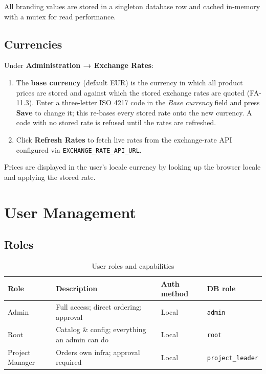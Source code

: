\documentclass[12pt,a4paper,twoside]{report}
\newcommand{\code}[1]{\texttt{#1}}
\begin{document}
All branding values are stored in a singleton database row and cached
in-memory with a mutex for read performance.

\section{Currencies}
\label{sec:currencies}

Under \textbf{Administration → Exchange Rates}:

\begin{enumerate}
  \item The \textbf{base currency} (default EUR) is the currency in
        which all product prices are stored and against which the
        stored exchange rates are quoted (FA-11.3). Enter a
        three-letter ISO 4217 code in the \emph{Base currency} field
        and press \textbf{Save} to change it; this re-bases every
        stored rate onto the new currency. A code with no stored rate
        is refused until the rates are refreshed.
  \item Click \textbf{Refresh Rates} to fetch live rates from the
        exchange-rate API configured via
        \code{EXCHANGE\_RATE\_API\_URL}.
\end{enumerate}

Prices are displayed in the user's locale currency by looking up the
browser locale and applying the stored rate.

\chapter{User Management}
\label{ch:users}

\section{Roles}

\begin{table}[H]
  \centering
  \caption{User roles and capabilities}
  \begin{tabularx}{\linewidth}{@{}l>{\raggedright\arraybackslash}Xll@{}}
    \toprule
    \textbf{Role} & \textbf{Description} &
      \textbf{Auth method} & \textbf{DB role} \\
    \midrule
    Admin         & Full access; direct ordering; approval & Local & \code{admin} \\
    Root    & Catalog \& config; everything an admin can do & Local & \code{root} \\
    Project Manager  & Orders own infra; approval required     & Local & \code{project\_leader} \\
    \bottomrule
  \end{tabularx}
\end{table}
\end{document}
